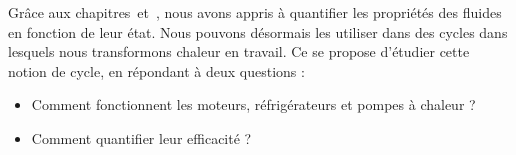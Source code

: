 Grâce aux chapitres~\quatre et~\cinq, nous avons appris à quantifier les propriétés des fluides en fonction de leur état. Nous pouvons désormais les utiliser dans des cycles dans lesquels nous transformons chaleur en travail. Ce \courssix se propose d’étudier cette notion de cycle, en répondant à deux questions :
\begin{itemize}
	\item Comment fonctionnent les moteurs, réfrigérateurs et pompes à chaleur ?
	\item Comment quantifier leur efficacité ?
\end{itemize}
